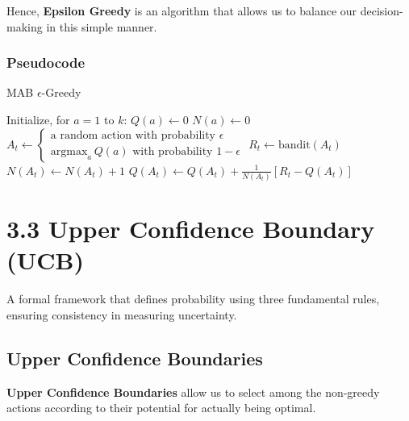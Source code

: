 \documentclass[
  letterpaper,
  DIV=11,
  numbers=noendperiod]{scrreprt}
\begin{document}
Hence, \textbf{Epsilon Greedy} is an algorithm that allows us to balance
our decision-making in this simple manner.

\subsection{Pseudocode}\label{pseudocode}

\begin{algorithm}[htb!]
\caption{MAB $\epsilon$-Greedy}
\begin{algorithmic}[1]
\State Initialize, for $a = 1$ to $k$:
\State $Q(a) \gets 0$ 
\State $N(a) \gets 0$ \\
    \State $A_t \gets
        \begin{cases}
            \text{a random action with probability } \epsilon \\
            \text{argmax}_a\, Q(a) \text{ with probability } 1-\epsilon 
        \end{cases}$
    \State $R_t \gets \text{bandit}(A_t)$
    \State $N(A_t) \gets N(A_t) + 1$
    \State $Q(A_t) \gets Q(A_t) + \frac{1}{N(A_t)}[R_t - Q(A_t)]$
\Endfor

\end{algorithmic}
\end{algorithm}

\chapter{3.3 Upper Confidence Boundary
(UCB)}\label{upper-confidence-boundary-ucb}

\begin{tcolorbox}[enhanced jigsaw, arc=.35mm, toprule=.15mm, leftrule=.75mm, colback=white, left=2mm, colframe=quarto-callout-note-color-frame, rightrule=.15mm, opacityback=0, breakable, bottomrule=.15mm]

A formal framework that defines probability using three fundamental
rules, ensuring consistency in measuring uncertainty. 🎲

\end{tcolorbox}

\section{Upper Confidence Boundaries}\label{upper-confidence-boundaries}

\textbf{Upper Confidence Boundaries} allow us to select among the
non-greedy actions according to their potential for actually being
optimal.
\end{document}
